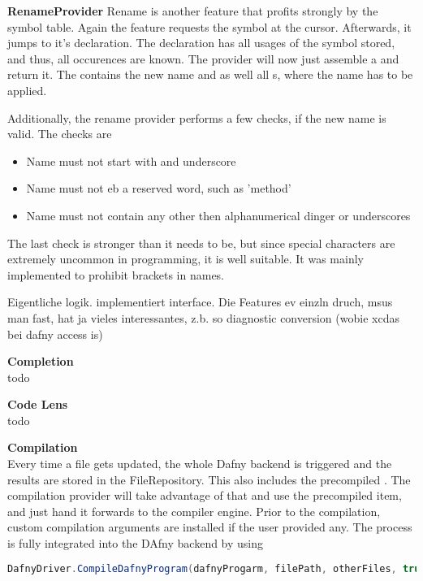 \textbf{RenameProvider}
Rename is another feature that profits strongly by the symbol table. Again the feature requests the symbol at the cursor. Afterwards, it jumps to it's declaration. The declaration has all usages of the symbol stored, and thus, all occurences are known. The provider will now just assemble a  and return it. The  contains the new name and as well all s, where the name has to be applied.

Additionally, the rename provider performs a few checks, if the new name is valid. The checks are
\begin{itemize}
    \item Name must not start with and underscore
    \item Name must not eb a reserved word, such as 'method'
    \item Name must not contain any other then alphanumerical dinger or underscores
\end{itemize}

The last check is stronger than it needs to be, but since special characters are extremely uncommon in programming, it is well suitable. It was mainly implemented to prohibit brackets in names.


Eigentliche logik. implementiert interface. Die Features ev einzln druch, msus man fast, hat ja vieles interessantes, z.b. so diagnostic conversion (wobie xcdas bei dafny access is)

\textbf{Completion}\\
todo

\textbf{Code Lens}\\
todo

\textbf{Compilation}\\
Every time a file gets updated, the whole Dafny backend is triggered and the results are stored in the FileRepository. This also includes the precompiled . The compilation provider will take advantage of that and use the precompiled item, and just hand it forwards to the compiler engine. Prior to the compilation, custom compilation arguments are installed if the user provided any. The process is fully integrated into the DAfny backend by using

\begin{lstlisting}[language=csharp, caption={Calling the Dafny Compiler}, captionpos=b, label={lst:dafnycompiler}]
DafnyDriver.CompileDafnyProgram(dafnyProgarm, filePath, otherFiles, true, textwriter);
\end{lstlisting}

